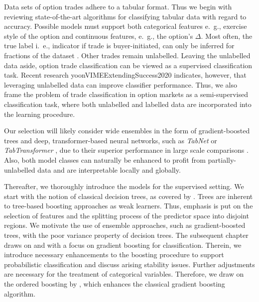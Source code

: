 Data sets of option trades adhere to a tabular format.  Thus we begin with reviewing state-of-the-art algorithms for classifying tabular data with regard to accuracy. Possible models must support both categorical features e.~g., exercise style of the option and continuous features, e.~g., the option's $\Delta$. Most often, the true label i.~e., indicator if trade is buyer-initiated, can only be inferred for fractions of the dataset \autocites{grauerOptionTradeClassification2022}{savickasInferringDirectionOption2003}. Other trades remain unlabelled. Leaving the unlabelled data aside, option trade classification can be viewed as a supervised classification task. Recent research \autocite{arikTabNetAttentiveInterpretable2020}\autocite{huangTabTransformerTabularData2020}{yoonVIMEExtendingSuccess2020} indicates, however, that leveraging unlabelled data can improve classifier performance. Thus, we also frame the problem of trade classification in option markets as a semi-supervised classification task, where both unlabelled and labelled data are incorporated into the learning procedure. 

Our selection will likely consider wide ensembles in the form of gradient-boosted trees and deep, transformer-based neural networks, such as \textit{TabNet} \autocite{arikTabNetAttentiveInterpretable2020} or \textit{TabTransformer} \autocite{huangTabTransformerTabularData2020}, due to their superior performance in large scale comparisons \autocites{borisovDeepNeuralNetworks2022}{gorishniyRevisitingDeepLearning2021}{grinsztajnWhyTreebasedModels}{shwartz-zivTabularDataDeep2021}. Also, both model classes can naturally be enhanced to profit from partially-unlabelled data and are interpretable locally and globally. 

Thereafter, we thoroughly introduce the models for the supervised setting. We start with the notion of classical decision trees, as covered by \textcite{breimanClassificationRegressionTrees2017}. Trees are inherent to tree-based boosting approaches as weak learners. Thus, emphasis is put on the selection of features and the splitting process of the predictor space into disjoint regions. We motivate the use of ensemble approaches, such as gradient-boosted trees, with the poor variance property of decision trees. The subsequent chapter draws on \textcite{hastietrevorElementsStatisticalLearning2009} and \textcite{friedmanGreedyFunctionApproximation2001} with a focus on gradient boosting for classification. Therein, we introduce necessary enhancements to the boosting procedure to support probabilistic classification and discuss arising stability issues. Further adjustments are necessary for the treatment of categorical variables. Therefore, we draw on the ordered boosting by \textcite{prokhorenkovaCatBoostUnbiasedBoosting2018}, which enhances the classical gradient boosting algorithm.

